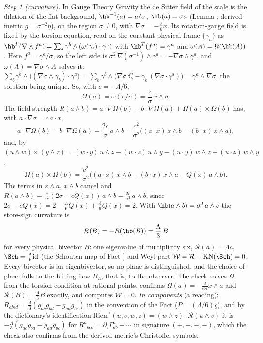 \emph{Step 1 (curvature).} In Gauge Theory Gravity the de Sitter field of the scale is the dilation of the flat background, $\hb^{-1}(a) = a/\sigma$, $\hb(a) = \sigma a$ (Lemma ; derived metric $g = \sigma^{-2}\eta$), on the region $\sigma \neq 0$, with $\nabla\sigma = -\tfrac{\Lambda}{6}x$. Its rotation-gauge field is fixed by the torsion equation, read on the constant physical frame $\{\gamma_{a}\}$ as $\hb^{T}(\nabla \wedge f^{a}) = \sum_{b}\gamma^{b} \wedge (\omega(\gamma_{b}) \cdot \gamma^{a})$ with $\hb^{T}(f^{a}) = \gamma^{a}$ and $\omega(A) = \Omega(\hb(A))$. Here $f^{a} = \gamma^{a}/\sigma$, so the left side is $\sigma^{2}\,\nabla(\sigma^{-1}) \wedge \gamma^{a} = -\nabla\sigma \wedge \gamma^{a}$, and $\omega(A) = \nabla\sigma \wedge A$ solves it: $\sum_{b}\gamma^{b} \wedge \bigl((\nabla\sigma \wedge \gamma_{b}) \cdot \gamma^{a}\bigr) = \sum_{b}\gamma^{b} \wedge \bigl(\nabla\sigma\,\delta^{a}_{b} - \gamma_{b}\,(\nabla\sigma \cdot \gamma^{a})\bigr) = \gamma^{a} \wedge \nabla\sigma$, the solution being unique. So, with $c = -\Lambda/6$,
\[
\Omega(a) = \omega(a/\sigma) = \frac{c}{\sigma}\,x \wedge a .
\]
The field strength $R(a \wedge b) = a \cdot \nabla\Omega(b) - b \cdot \nabla\Omega(a) + \Omega(a) \times \Omega(b)$ has, with $a \cdot \nabla\sigma = c\,a \cdot x$,
\[
a \cdot \nabla\Omega(b) - b \cdot \nabla\Omega(a) = \frac{2c}{\sigma}\,a \wedge b - \frac{c^{2}}{\sigma^{2}}\bigl((a \cdot x)\,x \wedge b - (b \cdot x)\,x \wedge a\bigr),
\]
and, by $(u \wedge w) \times (y \wedge z) = (w \cdot y)\,u \wedge z - (w \cdot z)\,u \wedge y - (u \cdot y)\,w \wedge z + (u \cdot z)\,w \wedge y$,
\[
\Omega(a) \times \Omega(b) = \frac{c^{2}}{\sigma^{2}}\bigl((a \cdot x)\,x \wedge b - (b \cdot x)\,x \wedge a - Q(x)\,a \wedge b\bigr).
\]
The terms in $x \wedge a$, $x \wedge b$ cancel and $R(a \wedge b) = \tfrac{c}{\sigma^{2}}(2\sigma - cQ(x))\,a \wedge b = \tfrac{2c}{\sigma^{2}}\,a \wedge b$, since $2\sigma - cQ(x) = 2 - \tfrac{\Lambda}{6}Q(x) + \tfrac{\Lambda}{6}Q(x) = 2$. With $\hb(a \wedge b) = \sigma^{2}\,a \wedge b$ the store-sign curvature is
\[
\mathcal{R}(B) = -R(\hb(B)) = \frac{\Lambda}{3}\,B
\]
for every physical bivector $B$: one eigenvalue of multiplicity six, $\mathcal{R}(a) = \Lambda a$, $\Sch = \tfrac{\Lambda}{6}\mathrm{id}$ (the Schouten map of Fact ) and Weyl part $\mathcal{W} = \mathcal{R} - \mathrm{KN}(\Sch) = 0$. Every bivector is an eigenbivector, so no plane is distinguished, and the choice of plane falls to the Killing flow $B_{\Lambda}$, that is, to the observer. The check solves $\Omega$ from the torsion condition at rational points, confirms $\Omega(a) = -\tfrac{\Lambda}{6\sigma}x \wedge a$ and $\mathcal{R}(B) = \tfrac{\Lambda}{3}B$ exactly, and computes $\mathcal{W} = 0$. \emph{In components} (a reading): $R_{abcd} = \tfrac{\Lambda}{3}(g_{ac}g_{bd} - g_{ad}g_{bc})$ in the convention of the Fact ($P = (\Lambda/6)g$), and by the dictionary's identification $\mathrm{Riem}^{\circ}(u, v, w, z) = (w \wedge z) \cdot \mathcal{R}(u \wedge v)$ it is $-\tfrac{\Lambda}{3}(g_{ac}g_{bd} - g_{ad}g_{bc})$ for $R^{a}{}_{bcd} = \partial_{c}\Gamma^{a}_{db} - \cdots$ in signature $(+,-,-,-)$, which the check also confirms from the derived metric's Christoffel symbols.

